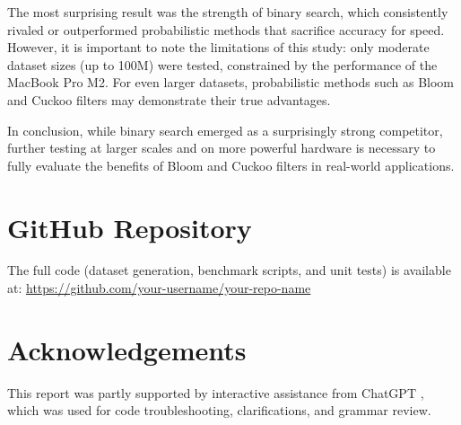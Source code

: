 \documentclass[acmsmall]{acmart}
\begin{document}
The most surprising result was the strength of binary search, which consistently rivaled or outperformed probabilistic methods that sacrifice accuracy for speed. However, it is important to note the limitations of this study: only moderate dataset sizes (up to 100M) were tested, constrained by the performance of the MacBook Pro M2. For even larger datasets, probabilistic methods such as Bloom and Cuckoo filters may demonstrate their true advantages.  

In conclusion, while binary search emerged as a surprisingly strong competitor, further testing at larger scales and on more powerful hardware is necessary to fully evaluate the benefits of Bloom and Cuckoo filters in real-world applications.

\section*{GitHub Repository}
The full code (dataset generation, benchmark scripts, and unit tests) is available at:  
\url{https://github.com/your-username/your-repo-name}

\section*{Acknowledgements}
This report was partly supported by interactive assistance from ChatGPT \cite{chatgpt}, which was used for code troubleshooting, clarifications, and grammar review.



\end{document}
